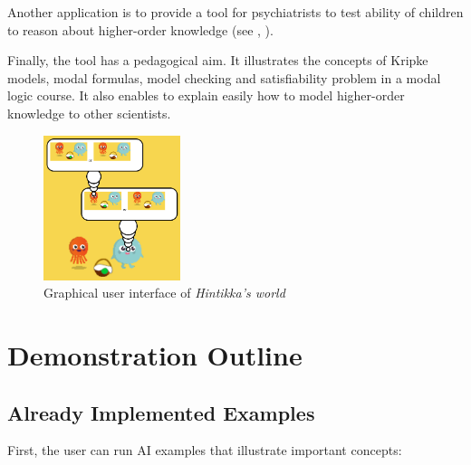 \documentclass{article}
\begin{document}
Another application is to provide a tool for psychiatrists to test ability of children to reason about higher-order knowledge (see \cite{DBLP:conf/cogsci/ArslanVTH15}, \cite{wimmer1983beliefs}).

Finally, the tool has a pedagogical aim. It illustrates the concepts of Kripke models, modal formulas, model checking and satisfiability problem in a modal logic course. It also enables to explain easily 
how to model higher-order knowledge to other scientists.








\begin{figure}
	\begin{center}
		\includegraphics[width=4cm]{screenshot.png}
	\end{center}
	\caption{Graphical user interface of \emph{Hintikka's world}\label{figure:gui}}
\end{figure}


\section{Demonstration Outline}
\label{section:demonstration}

\subsection{Already Implemented Examples}

First, the user can run AI examples that illustrate important concepts:
\end{document}
